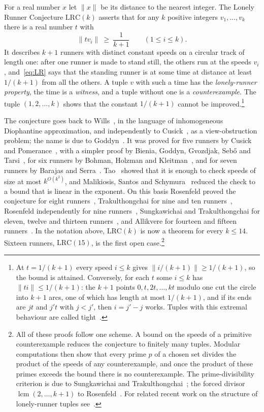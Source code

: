 \documentclass[aps,prd,twocolumn,superscriptaddress,nofootinbib,longbibliography,floatfix,showkeys,amsmath,amssymb,10pt]{revtex4-2}
\theoremstyle{definition}
\theoremstyle{remark}
\newcommand{\LRC}{\mathrm{LRC}}
\begin{document}
For a real number $x$ let $\|x\|$ be its distance to the nearest integer.
The Lonely Runner Conjecture $\LRC(k)$ asserts that for any $k$ positive
integers $v_1,\dots,v_k$ there is a real number $t$ with
\begin{equation}\label{eq:LR}
 \|t v_i\|\ \ge\ \frac1{k+1}\qquad(1\le i\le k).
\end{equation}
It describes $k+1$ runners with distinct constant speeds on a circular track
of length one: after one runner is made to stand still, the others run at
the speeds $v_i$, and~\eqref{eq:LR} says that the standing runner is at some
time at distance at least $1/(k+1)$ from all the others. A tuple $v$ with
such a time has the \emph{lonely-runner property}, the time is a
\emph{witness}, and a tuple without one is a \emph{counterexample}. The
tuple $(1,2,\dots,k)$ shows that the constant $1/(k+1)$ cannot be
improved.\footnote{At $t=1/(k+1)$ every speed $i\le k$ gives
$\|i/(k+1)\|\ge 1/(k+1)$, so the bound is attained. Conversely, for each
$t$ some $i\le k$ has $\|ti\|\le 1/(k+1)$: the $k+1$ points
$0,t,2t,\dots,kt$ modulo one cut the circle into $k+1$ arcs, one of which
has length at most $1/(k+1)$, and if its ends are $jt$ and $j't$ with
$j<j'$, then $i=j'-j$ works. Tuples with this extremal behaviour
are called tight~\cite{GW06}.}

The conjecture goes back to Wills~\cite{Wil67}, in the language of
inhomogeneous Diophantine approximation, and independently to
Cusick~\cite{Cus73}, as a view-obstruction problem; the name is due to
Goddyn~\cite{BGGST98}. It was proved for five runners by Cusick and
Pomerance~\cite{CP84}, with a simpler proof by Bienia, Goddyn, Gvozdjak,
Seb\H{o} and Tarsi~\cite{BGGST98}, for six runners by Bohman, Holzman and
Kleitman~\cite{BHK01}, and for seven runners by Barajas and
Serra~\cite{BS08}. Tao~\cite{Tao18} showed that it is enough to check
speeds of size at most $k^{O(k^2)}$, and Malikiosis, Santos and
Schymura~\cite{MSS25} reduced the check to a bound that is linear in the
exponent. On this basis Rosenfeld proved the conjecture for eight
runners~\cite{Ros26a}, Trakulthongchai for nine and ten
runners~\cite{Tra26}, Rosenfeld independently for nine
runners~\cite{Ros26b}, Sungkawichai and Trakulthongchai for eleven, twelve
and thirteen runners~\cite{ST26}, and Allikvere for fourteen and fifteen
runners~\cite{All26}. In the notation above, $\LRC(k)$ is now a theorem for
every $k\le 14$. Sixteen runners, $\LRC(15)$, is the first open
case.\footnote{All of these proofs follow one scheme. A bound on the speeds
of a primitive counterexample reduces the conjecture to finitely many
tuples. Modular computations then show that every prime $p$ of a chosen set
divides the product of the speeds of any counterexample, and once the
product of these primes exceeds the bound there is no counterexample. The
prime-divisibility criterion is due to Sungkawichai and
Trakulthongchai~\cite{ST26}; the forced divisor $\operatorname{lcm}(2,\dots,k+1)$
to Rosenfeld~\cite[Lemma~4]{Ros26a}. For related recent work on the
structure of lonely-runner tuples see~\cite{GK26,BCS26,PS24}.}
\end{document}

